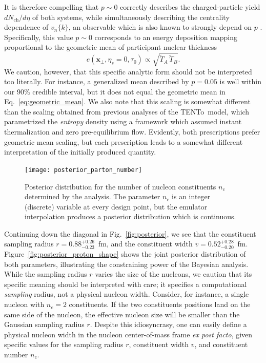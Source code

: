 \documentclass[aps,prc,reprint,amsmath,nofootinbib]{revtex4-1}
\newcommand{\trento}{T\raisebox{-0.5ex}{R}ENTo}
\newcommand{\nch}{N_\text{ch}}
\newcommand{\vnk}[2]{v_#1\{#2\}}
\newcommand{\T}{\tilde{T}}
\newcommand{\xv}{\mathbf x}
\begin{document}
It is therefore compelling that $p \sim 0$ correctly describes the charged-particle yield $d\nch/d\eta$ of both systems, while simultaneously describing the centrality dependence of $\vnk{n}{k}$, an observable which is also known to strongly depend on $p$ \cite{Bernhard:2018hnz}.
Specifically, this value $p \sim 0$ corresponds to an energy deposition mapping proportional to the geometric mean of participant nuclear thickness
\begin{equation}
  \label{eq:geometric_mean}
  e(\xv_\perp, \eta_s=0, \tau_0) \propto \sqrt{\T_A\, \T_B}.
\end{equation}
We caution, however, that this specific analytic form should not be interpreted too literally.
For instance, a generalized mean described by $p=0.05$ is well within our 90\% credible interval, but it does not equal the geometric mean in Eq.~\eqref{eq:geometric_mean}.
We also note that this scaling is somewhat different than the scaling obtained from previous analyses of the \trento\ model, which parametrized the \emph{entropy} density using a framework which assumed instant thermalization and zero pre-equilibrium flow.
Evidently, both prescriptions prefer geometric mean scaling, but each prescription leads to a somewhat different interpretation of the initially produced quantity.

\begin{figure}
  \texttt{[image: posterior\_parton\_number]}
  \caption{
    \label{fig:posterior_parton_number}
    Posterior distribution for the number of nucleon constituents $n_c$ determined by the analysis.
    The parameter $n_c$ is an integer (discrete) variable at every design point, but the emulator interpolation produces a posterior distribution which is continuous.
  }
\end{figure}

Continuing down the diagonal in Fig.~\ref{fig:posterior}, we see that the constituent sampling radius $r=0.88_{-0.23}^{+0.26}$~fm, and the constituent width $v=0.52_{-0.20}^{+0.28}$~fm.
Figure~\ref{fig:posterior_proton_shape} shows the joint posterior distribution of both parameters, illustrating the constraining power of the Bayesian analysis.
While the sampling radius $r$ varies the size of the nucleons, we caution that its specific meaning should be interpreted with care; it specifies a computational \emph{sampling} radius, not a physical nucleon width.
Consider, for instance, a single nucleon with $n_c = 2$ constituents.
If the two constituents positions land on the same side of the nucleon, the effective nucleon size will be smaller than the Gaussian sampling radius $r$.
Despite this idiosyncrasy, one can easily define a physical nucleon width in the nucleon center-of-mass frame \emph{ex post facto}, given specific values for the sampling radius $r$, constituent width $v$, and constituent number $n_c$.
\end{document}
